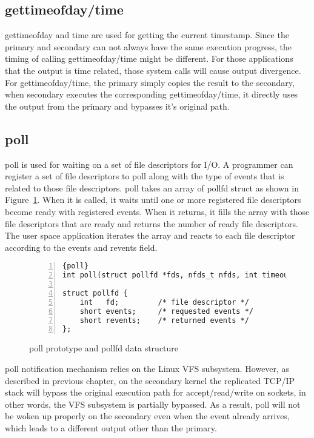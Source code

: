 \subsection{gettimeofday/time}

gettimeofday and time are used for getting the current timestamp. Since the primary and secondary can not always have the same execution progress, the timing of calling gettimeofday/time might be different. For those applications that the output is time related, those system calls will cause output divergence. For gettimeofday/time, the primary simply copies the result to the secondary, when secondary executes the corresponding gettimeofday/time, it directly uses the output from the primary and bypasses it's original path.

\subsection{poll}

poll is used for waiting on a set of file descriptors for I/O. A programmer can register a set of file descriptors to poll along with the type of events that is related to those file descriptors. poll takes an array of pollfd struct as shown in Figure~\ref{f:pollfd}. When it is called, it waits until one or more registered file descriptors become ready with registered events. When it returns, it fills the array with those file descriptors that are ready and returns the number of ready file descriptors. The user space application iterates the array and reacts to each file descriptor according to the events and revents field.

\begin{figure}
\begin{lstlisting}[numbers=left, frame=single, basicstyle=\small, breaklines]{poll}
int poll(struct pollfd *fds, nfds_t nfds, int timeout);

struct pollfd {
    int   fd;         /* file descriptor */
    short events;     /* requested events */
    short revents;    /* returned events */
};
\end{lstlisting}
\caption{poll prototype and pollfd data structure}
\label{f:pollfd}
\end{figure}

poll notification mechanism relies on the Linux VFS subsystem. However, as described in previous chapter, on the secondary kernel the replicated TCP/IP stack will bypass the original execution path for accept/read/write on sockets, in other words, the VFS subsystem is partially bypassed. As a result, poll will not be woken up properly on the secondary even when the event already arrives, which leads to a different output other than the primary.

